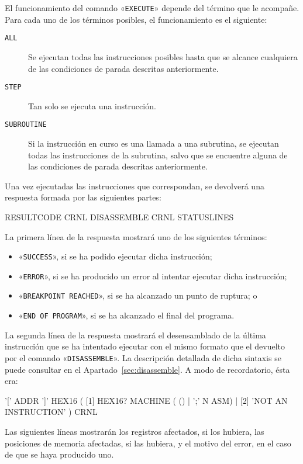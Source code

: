 \documentclass[notitlepage,11pt,a4paper,final,twoside]{article}
\begin{document}
El funcionamiento del comando «\texttt{EXECUTE}» depende del término
que le acompañe. Para cada uno de los términos posibles, el
funcionamiento es el siguiente:
\begin{description}
\item[\texttt{ALL}] Se ejecutan todas las instrucciones posibles hasta
  que se alcance cualquiera de las condiciones de parada descritas
  anteriormente.
\item[\texttt{STEP}] Tan solo se ejecuta una instrucción.
\item[\texttt{SUBROUTINE}] Si la instrucción en curso es una llamada a
  una subrutina, se ejecutan todas las instrucciones de la subrutina,
  salvo que se encuentre alguna de las condiciones de parada descritas
  anteriormente.
\end{description}

Una vez ejecutadas las instrucciones que correspondan, se devolverá
una respuesta formada por las siguientes partes:

\begin{rail}
  RESULTCODE CRNL DISASSEMBLE CRNL STATUSLINES
\end{rail}

La primera línea de la respuesta mostrará uno de los siguientes
términos:
\begin{itemize}
\item «\texttt{SUCCESS}», si se ha podido ejecutar dicha instrucción;
\item «\texttt{ERROR}», si se ha producido un error al intentar
  ejecutar dicha instrucción;
\item «\texttt{BREAKPOINT REACHED}», si se ha alcanzado un punto de
  ruptura; o
\item «\texttt{END OF PROGRAM}», si se ha alcanzado el final del
  programa.
\end{itemize}

La segunda línea de la respuesta mostrará el desensamblado de la
última instrucción que se ha intentado ejecutar con el mismo formato
que el devuelto por el comando «\texttt{DISASSEMBLE}». La descripción
detallada de dicha sintaxis se puede consultar en el
Apartado~\ref{sec:disassemble}. A modo de recordatorio, ésta era:

\begin{rail}
 '[' ADDR ']' HEX16
  (
    [1]  HEX16? MACHINE ( () | ';' N ASM) | 
    [2] 'NOT AN INSTRUCTION'
  ) CRNL
\end{rail}

Las siguientes líneas mostrarán los registros afectados, si los
hubiera, las posiciones de memoria afectadas, si las hubiera, y el
motivo del error, en el caso de que se haya producido uno.
\end{document}
